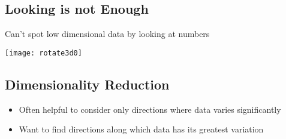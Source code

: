 
\begin{slide}
\section[-2]{Looking is not Enough}

\pb
Can't spot low dimensional data by looking at numbers\pause
\begin{center}
  \texttt{[image: rotate3d0]}
\end{center}

\end{slide}



\begin{slide}
\section{Dimensionality Reduction}

\pb
\begin{itemize}
\item Often helpful to consider only directions where data varies
  significantly\pauseh
\item Want to find directions along which data has its greatest
  variation\pauseh
  \begin{center}
    \pause
  \end{center}
\end{itemize}


\end{slide}



